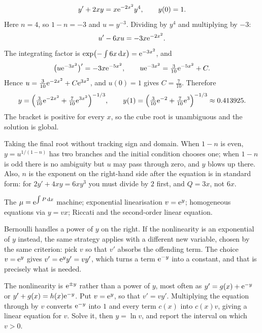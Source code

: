 \begin{worked}
\[y'+2xy=x\mathrm{e}^{-2x^{2}}y^{4},\qquad y(0)=1.\]
Here $n=4$, so $1-n=-3$ and $u=y^{-3}$. Dividing by $y^{4}$ and multiplying by $-3$:
\[u'-6xu=-3x\mathrm{e}^{-2x^{2}}.\]
The integrating factor is $\exp\bigl(-\int6x\,\mathrm{d} x\bigr)=\mathrm{e}^{-3x^{2}}$, and
\[\bigl(u\mathrm{e}^{-3x^{2}}\bigr)'=-3x\mathrm{e}^{-5x^{2}},\qquad u\mathrm{e}^{-3x^{2}}=\tfrac{3}{10}\mathrm{e}^{-5x^{2}}+C.\]
Hence $u=\tfrac{3}{10}\mathrm{e}^{-2x^{2}}+C\mathrm{e}^{3x^{2}}$, and $u(0)=1$ gives $C=\tfrac{7}{10}$. Therefore
\[y=\Bigl(\tfrac{3}{10}\mathrm{e}^{-2x^{2}}+\tfrac{7}{10}\mathrm{e}^{3x^{2}}\Bigr)^{-1/3},\qquad y(1)=\Bigl(\tfrac{3}{10}\mathrm{e}^{-2}+\tfrac{7}{10}\mathrm{e}^{3}\Bigr)^{-1/3}\approx0.413925.\]
The bracket is positive for every $x$, so the cube root is unambiguous and the solution is global.
\end{worked}

\begin{trap}
Taking the final root without tracking sign and domain. When $1-n$ is even, $y=u^{1/(1-n)}$ has two branches and the initial condition chooses one; when $1-n$ is odd there is no ambiguity but $u$ may pass through zero, and $y$ blows up there. Also, $n$ is the exponent on the right-hand side after the equation is in standard form: for $2y'+4xy=6xy^{3}$ you must divide by $2$ first, and $Q=3x$, not $6x$.
\end{trap}

\begin{seealsob}The $\mu=\mathrm{e}^{\int P\,\mathrm{d} x}$ machine; exponential linearisation $v=\mathrm{e}^{y}$; homogeneous equations via $y=vx$; Riccati and the second-order linear equation.\end{seealsob}

Bernoulli handles a power of $y$ on the right. If the nonlinearity is an exponential of $y$ instead, the same strategy applies with a different new variable, chosen by the same criterion: pick $v$ so that $v'$ absorbs the offending term. The choice $v=\mathrm{e}^{y}$ gives $v'=\mathrm{e}^{y}y'=vy'$, which turns a term $\mathrm{e}^{-y}$ into a constant, and that is precisely what is needed.

\cue The nonlinearity is $\mathrm{e}^{\pm y}$ rather than a power of $y$, most often as $y'=g(x)+\mathrm{e}^{-y}$ or $y'+g(x)=h(x)\mathrm{e}^{-y}$.
\method Put $v=\mathrm{e}^{y}$, so that $v'=vy'$. Multiplying the equation through by $v$ converts $\mathrm{e}^{-y}$ into $1$ and every term $c(x)$ into $c(x)v$, giving a linear equation for $v$. Solve it, then $y=\ln v$, and report the interval on which $v>0$.

